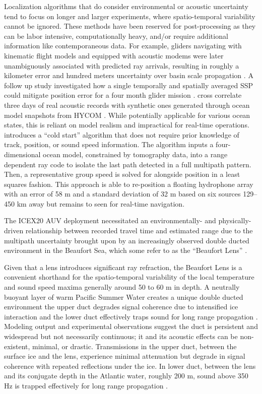 Localization algorithms that do consider environmental or acoustic uncertainty tend to focus on longer and larger experiments, where spatio-temporal variability cannot be ignored.
These methods have been reserved for post-processing as they can be labor intensive, computationally heavy, and/or require additional information like contemporaneous data.
For example, gliders navigating with kinematic flight models and equipped with acoustic modems were later unambiguously associated with predicted ray arrivals, resulting in roughly a kilometer error and hundred meters uncertainty over basin scale propagation \cite{VanUffelen2013}.
A follow up study investigated how a single temporally and spatially averaged SSP could mitigate position error for a four month glider mission \cite{vanuffelen2016localization}.
\citet{Wu2019} cross correlate three days of real acoustic records with synthetic ones generated through ocean model snapshots from HYCOM \cite{Chassignet2007}.
While potentially applicable for various ocean states, this is reliant on model realism and impractical for real-time operations.
\citet{Mikhalevsky2020} introduces a ``cold start'' algorithm that does not require prior knowledge of track, position, or sound speed information.
The algorithm inputs a four-dimensional ocean model, constrained by tomography data, into a range dependent ray code to isolate the last path detected in a full multipath pattern.
Then, a representative group speed is solved for alongside position in a least squares fashion. 
This approach is able to re-position a floating hydrophone array with an error of 58 m and a standard deviation of 32 m based on six sources 129--450 km away but remains to seen for real-time navigation.

The ICEX20 AUV deployment necessitated an environmentally- and physically-driven relationship between recorded travel time and estimated range due to the multipath uncertainty brought upon by an increasingly observed double ducted environment in the Beaufort Sea, which some refer to as the ``Beaufort Lens'' \citep{litvak2015acoustics,Chen2019,Chen2020}.

Given that a lens introduces significant ray refraction, the Beaufort Lens is a convenient shorthand for the spatio-temporal variability of the local temperature and sound speed maxima generally around 50 to 60 m in depth.
A neutrally buoyant layer of warm Pacific Summer Water creates a unique double ducted environment \textemdash the upper duct degrades signal coherence due to intensified ice interaction and the lower duct effectively traps sound for long range propagation \citep{Poulsen2017}. 
 Modeling output \citep{Duda2019,Duda2021} and experimental observations \citep{Ballard2020,Bhatt2021} suggest the duct is persistent and widespread but not necessarily continuous; it and its acoustic effects can be non-existent, minimal, or drastic.
Transmissions in the upper duct, between the surface ice and the lens, experience minimal attenuation but degrade in signal coherence with repeated reflections under the ice.
In lower duct, between the lens and its conjugate depth in the Atlantic water, roughly 200 m, sound above 350 Hz is trapped effectively for long range propagation \citep{Poulsen2017}.

